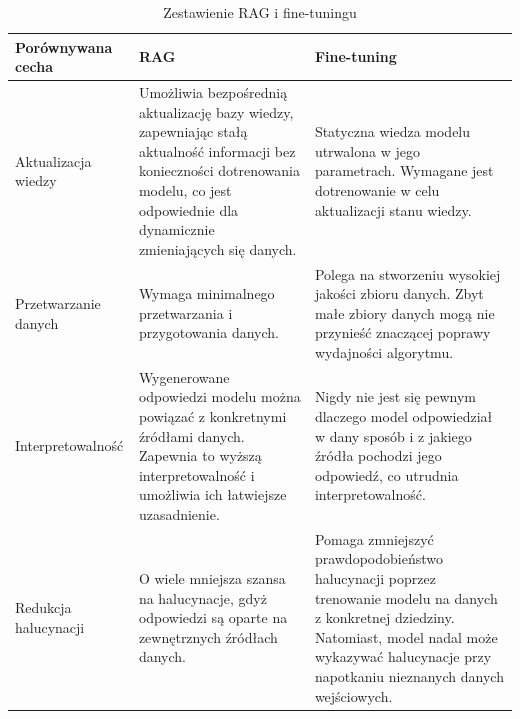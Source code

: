         \begin{table}[h]
            \centering
            \caption{Zestawienie RAG i fine-tuningu \cite{rag_for_llm2023}}
            \begin{tabularx}{\textwidth}{|p{3.5cm}|X|X|}
            \hline
            \textbf{Porównywana cecha} & \textbf{RAG} & \textbf{Fine-tuning} \\
            \hline
            Aktualizacja wiedzy & Umożliwia bezpośrednią aktualizację bazy wiedzy, zapewniając stałą aktualność informacji bez konieczności dotrenowania modelu, co jest odpowiednie dla dynamicznie zmieniających się danych. & Statyczna wiedza modelu utrwalona w jego parametrach. Wymagane jest dotrenowanie w celu aktualizacji stanu wiedzy. \\ \hline
            
            Przetwarzanie danych & Wymaga minimalnego przetwarzania i przygotowania danych. & Polega na stworzeniu wysokiej jakości zbioru danych. Zbyt małe zbiory danych mogą nie przynieść znaczącej poprawy wydajności algorytmu. \\ \hline
            
            Interpretowalność & Wygenerowane odpowiedzi modelu można powiązać z konkretnymi źródłami danych. Zapewnia to wyższą interpretowalność i umożliwia ich łatwiejsze uzasadnienie. & Nigdy nie jest się pewnym dlaczego model odpowiedział w dany sposób i z jakiego źródła pochodzi jego odpowiedź, co utrudnia interpretowalność. \\ \hline
            
            Redukcja halucynacji & O wiele mniejsza szansa na halucynacje, gdyż odpowiedzi są oparte na zewnętrznych źródłach danych. & Pomaga zmniejszyć prawdopodobieństwo halucynacji poprzez trenowanie modelu na danych z konkretnej dziedziny. Natomiast, model nadal może wykazywać halucynacje przy napotkaniu nieznanych danych wejściowych. \\ \hline
            \end{tabularx}
            \label{rag_vs_finetuning}
        \end{table}


